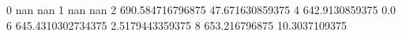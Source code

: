 0 nan nan
1 nan nan
2 690.584716796875 47.671630859375
4 642.9130859375 0.0
6 645.4310302734375 2.5179443359375
8 653.216796875 10.3037109375
